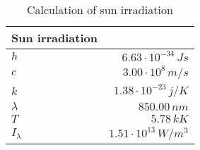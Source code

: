 \begin{table}[H]
\centering
\caption{Calculation of sun irradiation}
\label{tab:sun_irradiation}
\begin{tabular}{|l|r|}\hline
    \textbf{Sun irradiation} & \\
    \hline 
    $h$ & $6.63\cdot10^{-34}\,Js$ \\
    $c$ & $3.00\cdot10^{8}\,m/s$ \\
    $k$ & $1.38\cdot10^{-23}\,j/K$ \\
    $\lambda$ & $850.00\,n m$ \\
    $T$ & $5.78\,k K$ \\
    $I_\lambda$ & $1.51\cdot10^{13}\,W/m^3$ \\
    \hline 
\end{tabular}
\end{table}

